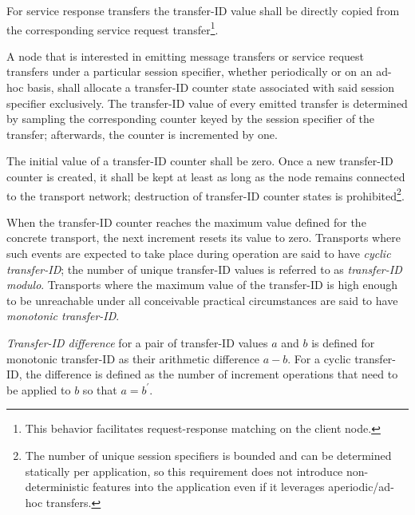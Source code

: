 For service response transfers the transfer-ID value shall be directly copied from the corresponding
service request transfer\footnote{This behavior facilitates request-response matching on the client node.}.

A node that is interested in emitting message transfers or service request transfers
under a particular session specifier, whether periodically or on an ad-hoc basis,
shall allocate a transfer-ID counter state associated with said session specifier exclusively.
The transfer-ID value of every emitted transfer is determined by sampling the corresponding counter
keyed by the session specifier of the transfer; afterwards, the counter is incremented by one.

The initial value of a transfer-ID counter shall be zero.
Once a new transfer-ID counter is created,
it shall be kept at least as long as the node remains connected to the transport network;
destruction of transfer-ID counter states is prohibited\footnote{%
    The number of unique session specifiers is bounded and can be determined statically per application,
    so this requirement does not introduce non-deterministic features into the application even if it leverages
    aperiodic/ad-hoc transfers.
}.

When the transfer-ID counter reaches the maximum value defined for the concrete transport,
the next increment resets its value to zero.
Transports where such events are expected to take place during operation are said to have \emph{cyclic transfer-ID};
the number of unique transfer-ID values is referred to as \emph{transfer-ID modulo}.
Transports where the maximum value of the transfer-ID is high enough to be unreachable under all conceivable
practical circumstances are said to have \emph{monotonic transfer-ID}.

\emph{Transfer-ID difference} for a pair of transfer-ID values $a$ and $b$ is defined
for monotonic transfer-ID as their arithmetic difference $a-b$.
For a cyclic transfer-ID, the difference is defined as the number of increment operations that need to be applied
to $b$ so that $a = b^\prime{}$.

